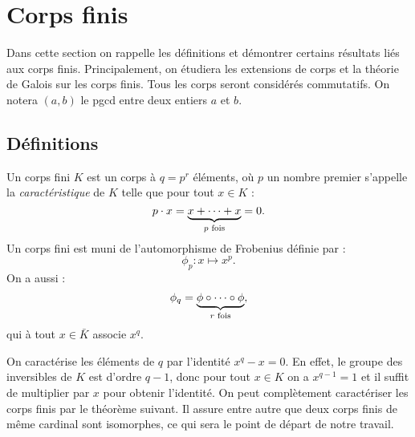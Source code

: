 \documentclass[a4paper]{article} %
\numberwithin{section}{part}
\numberwithin{equation}{section}
\begin{document}
\section{Corps finis}
Dans cette section on rappelle les définitions et démontrer certains 
résultats liés aux corps finis. Principalement, on étudiera les extensions 
de corps et la théorie de Galois sur les corps finis. Tous les corps seront
considérés commutatifs. On notera $(a,b)$ le pgcd entre deux entiers $a$ et $b$.

\subsection{Définitions}
Un corps fini $K$ est un corps à $q = p^r$ éléments, où $p$ un nombre premier
s'appelle la \emph{caractéristique} de $K$ telle que pour tout $x\in K$ :
\begin{equation}
p\cdot x = \underbrace{x+\dots+x}_{p\textup{ fois}} = 0.
\end{equation}
Un corps fini est muni de l'automorphisme de Frobenius définie par :
\begin{equation}
\phi_p : x \mapsto x^p.
\end{equation}
On a aussi :
\begin{equation}
\phi_q = \underbrace{\phi\circ\cdots\circ\phi}_{r\textup{
fois}},
\end{equation}
qui à tout $x\in \bar{K}$ associe $x^q$.\par
On caractérise les éléments de $q$ par l'identité $x^q - x = 0$. En effet, le
groupe des inversibles de $K$ est d'ordre $q-1$, donc pour tout $x\in K$ on a
$x^{q-1} = 1$ et il suffit de multiplier par $x$ pour obtenir l'identité.
On peut complètement caractériser les corps finis par le théorème suivant. Il
assure entre autre que deux corps finis de même cardinal sont isomorphes, ce qui
sera le point de départ de notre travail.
\end{document}

